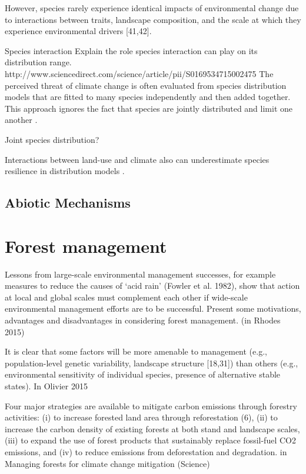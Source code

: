 However, species rarely experience identical impacts of environmental change due to interactions between traits, landscape composition, and the scale at which they experience environmental drivers [41,42].


Species interaction
Explain the role species interaction can play on its distribution range. \\
http://www.sciencedirect.com/science/article/pii/S0169534715002475
The perceived threat of climate change is often evaluated from species distribution models that are fitted to many species independently and then added together. This approach ignores the fact that species are jointly distributed and limit one another \citep{clark2014}.

Joint species distribution?

Interactions between land-use and climate also can underestimate species resilience in distribution models \citep{Goring2017}.

\subsection{Abiotic Mechanisms}

\section{Forest management}

Lessons from large-scale environmental management successes, for example measures to reduce the causes of ‘acid rain’ (Fowler et al. 1982), show that action at local and global scales must complement each other if wide-scale environmental management efforts are to be successful.
Present some motivations, advantages and disadvantages in considering forest management. (in Rhodes 2015)

It is clear that some factors will be more amenable to management (e.g., population-level genetic variability, landscape structure
[18,31]) than others (e.g., environmental sensitivity of individual species, presence of alternative stable states). In Olivier 2015

Four major strategies are available to mitigate carbon emissions through forestry activities: (i) to increase forested land area through reforestation (6), (ii) to increase the carbon density of existing forests at both stand and landscape scales, (iii) to expand the use of forest products that sustainably replace fossil-fuel CO2 emissions, and (iv) to reduce emissions from deforestation and degradation. in Managing forests for climate change mitigation (Science)

